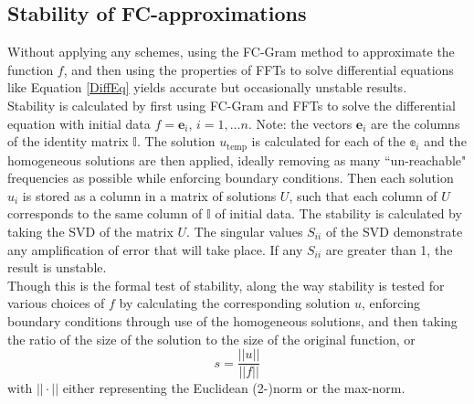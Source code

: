 \documentclass[11pt]{amsart}
\begin{document}
\subsection{Stability of FC-approximations}
Without applying any schemes, using the FC-Gram method to approximate the function $f$, and then using the properties of FFTs to solve differential equations like Equation \ref{DiffEq} yields accurate but occasionally unstable results.  \\
Stability is calculated by first using FC-Gram and FFTs to solve the differential equation with initial data $f=\mathbf{e}_i$, $i=1,\ldots n$. Note: the vectors $\mathbf{e}_i$ are the columns of the identity matrix $\mathbb{I}$. 
The solution $u_{\text{temp}}$ is calculated for each of the $\mathbb{e}_i$ and the homogeneous solutions are then applied, ideally removing as many ``un-reachable" frequencies as possible while enforcing boundary conditions.  
Then each solution $u_i$ is stored as a column in a matrix of solutions $U$, such that each column of $U$ corresponds to the same column of $\mathbb{I}$ of initial data. 
The stability is calculated by taking the SVD of the matrix $U$.  The singular values $S_{ii}$ of the SVD demonstrate any amplification of error that will take place.  If any $S_{ii}$ are greater than 1, the result is unstable.   
\\
Though this is the formal test of stability, along the way stability is tested for various choices of $f$ by calculating the corresponding solution $u$, enforcing boundary conditions through use of the homogeneous solutions, and then taking the ratio of the size of the solution to the size of the original function, or 
\begin{equation} 
s=\dfrac{||u||}{||f||}
\end{equation}
with $|| \cdot ||$ either representing the Euclidean (2-)norm or the max-norm.  
\end{document}
